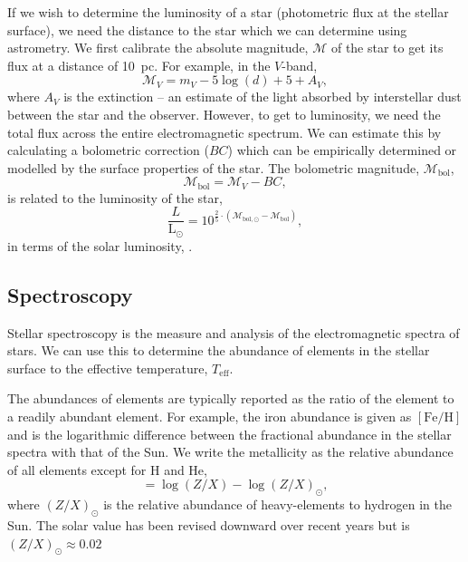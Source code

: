 If we wish to determine the luminosity of a star (photometric flux at the stellar surface), we need the distance to the star which we can determine using astrometry. We first calibrate the absolute magnitude, $\mathcal{M}$ of the star to get its flux at a distance of \SI{10}{pc}. For example, in the $V$-band,
\begin{equation}
    \mathcal{M}_V = m_V - 5 \log(d) + 5 + A_V,
\end{equation}
where $A_V$ is the extinction -- an estimate of the light absorbed by interstellar dust between the star and the observer. However, to get to luminosity, we need the total flux across the entire electromagnetic spectrum. We can estimate this by calculating a bolometric correction ($BC$) which can be empirically determined or modelled by the surface properties of the star. The bolometric magnitude, $\mathcal{M}_\mathrm{bol}$,
\begin{equation}
    \mathcal{M}_\mathrm{bol} = \mathcal{M}_V - BC,
\end{equation}
is related to the luminosity of the star,
\begin{equation}
    \frac{L}{\mathrm{L}_{\odot}}=10^{\frac{2}{5}\cdot\left(\mathcal{M}_{\mathrm{bol}, \odot}-\mathcal{M}_{\mathrm{bol}}\right)},
\end{equation}
in terms of the solar luminosity, \si{\solarluminosity}.

\subsection{Spectroscopy}

Stellar spectroscopy is the measure and analysis of the electromagnetic spectra of stars. We can use this to determine the abundance of elements in the stellar surface to the effective temperature, $T_\mathrm{eff}$.

The abundances of elements are typically reported as the ratio of the element to a readily abundant element. For example, the iron abundance is given as $[\mathrm{Fe/H}]$ and is the logarithmic difference between the fractional abundance in the stellar spectra with that of the Sun. We write the metallicity as the relative abundance of all elements except for H and He,
\begin{equation}
    [\mathrm{M/H}] = \log(Z/X) - \log(Z/X)_\odot,
\end{equation}
where $(Z/X)_\odot$ is the relative abundance of heavy-elements to hydrogen in the Sun. The solar value has been revised downward over recent years but is $(Z/X)_\odot \approx 0.02$ \citep{Grevesse.Sauval1998, Asplund.Grevesse.ea2005, Asplund.Grevesse.ea2009}

